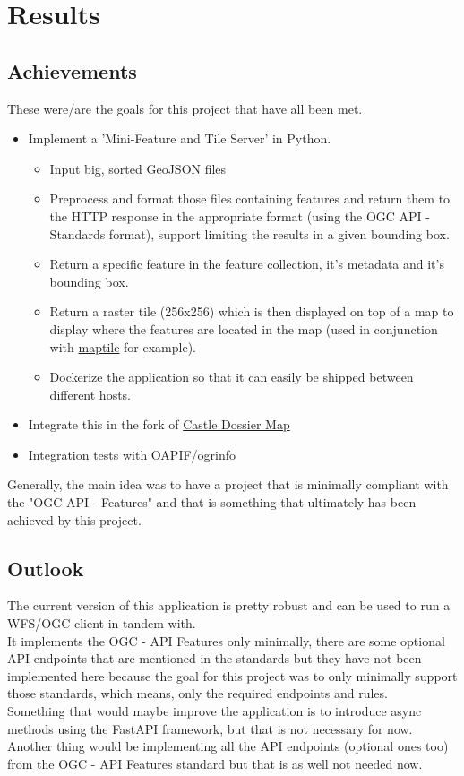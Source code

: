 \chapter{Results}

\section{Achievements}
These were/are the goals for this project that have all been met.\\
\begin{itemize}
	\item Implement a 'Mini-Feature and Tile Server' in Python.
	\begin{itemize}
		\item Input big, sorted GeoJSON files
		\item Preprocess and format those files containing features and return them to the HTTP response in the appropriate format (using the OGC API - Standards format), support limiting the results in a given bounding box.
		\item Return a specific feature in the feature collection, it's metadata and it's bounding box.
		\item Return a raster tile (256x256) which is then displayed on top of a map to display where the features are located in the map (used in conjunction with \href{maptile.com}{maptile} for example).
		\item Dockerize the application so that it can easily be shipped between different hosts.
	\end{itemize}
	\item Integrate this in the fork of \href{https://gitlab.com/geometalab/castle-map}{Castle Dossier Map}
	\item Integration tests with OAPIF/ogrinfo
\end{itemize}
Generally, the main idea was to have a project that is minimally compliant with the "OGC API - Features" and that is something that ultimately has been achieved by this project.
\newpage
\section{Outlook}
The current version of this application is pretty robust and can be used to run a WFS/OGC client in tandem with.\\
It implements the OGC - API Features only minimally, there are some optional API endpoints that are mentioned in the standards but they have not been implemented here because the goal for this project was to only minimally support those standards, which means, only the required endpoints and rules.\\
\newline
Something that would maybe improve the application is to introduce async methods using the FastAPI framework, but that is not necessary for now.\\
Another thing would be implementing all the API endpoints (optional ones too) from the OGC - API Features standard but that is as well not needed now.
